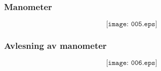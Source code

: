 \documentclass[aspectratio=169,xcolor=dvipsnames]{beamer}
\begin{document}

%
%
%
%
%
%
%
%
%
%
\begin{frame}
	\frametitle{Manometer}

	$$\texttt{[image: 005.eps]}$$
\end{frame}

%
%
%
%
\begin{frame}
	\frametitle{Avlesning av manometer}

	$$\texttt{[image: 006.eps]}$$
\end{frame}
\end{document}
